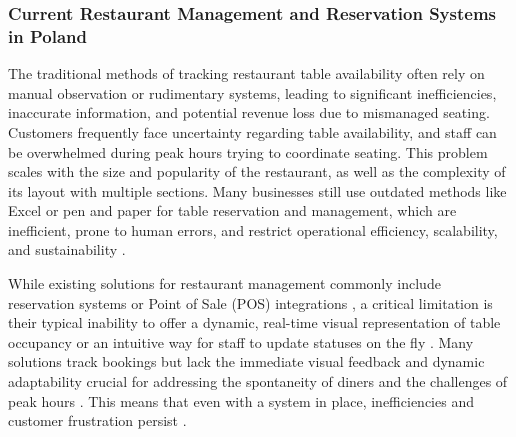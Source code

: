 \documentclass{article}
\begin{document}
\subsubsection{Current Restaurant Management and Reservation Systems in Poland}
The traditional methods of tracking restaurant table availability often rely on manual observation or rudimentary systems, leading to significant inefficiencies, inaccurate information, and potential revenue loss due to mismanaged seating. Customers frequently face uncertainty regarding table availability, and staff can be overwhelmed during peak hours trying to coordinate seating. This problem scales with the size and popularity of the restaurant, as well as the complexity of its layout with multiple sections. Many businesses still use outdated methods like Excel or pen and paper for table reservation and management, which are inefficient, prone to human errors, and restrict operational efficiency, scalability, and sustainability \parencite{skakun2024restaurant}.

While existing solutions for restaurant management commonly include reservation systems or Point of Sale (POS) integrations \parencite{skakun2024restaurant}, a critical limitation is their typical inability to offer a dynamic, real-time visual representation of table occupancy or an intuitive way for staff to update statuses on the fly \parencite{skakun2024restaurant}. Many solutions track bookings but lack the immediate visual feedback and dynamic adaptability crucial for addressing the spontaneity of diners and the challenges of peak hours \parencite{skakun2024restaurant}. This means that even with a system in place, inefficiencies and customer frustration persist \parencite{skakun2024restaurant}.
\end{document}
